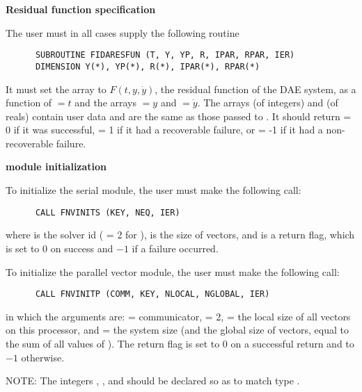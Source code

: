 \begin{Steps}
  
\item {\bf Residual function specification}
  
  The user must in all cases supply the following {\F} routine
\begin{verbatim}
      SUBROUTINE FIDARESFUN (T, Y, YP, R, IPAR, RPAR, IER)
      DIMENSION Y(*), YP(*), R(*), IPAR(*), RPAR(*)
\end{verbatim}
  It must set the  array to $F(t,y,\dot{y})$, the residual function of the DAE
  system, as a function of  $ = t$ and the arrays  $ = y$ and
   $ = \dot{y}$.  
  The arrays  (of integers) and  (of reals) contain user data
  and are the same as those passed to .
  It should return  = 0 if it was successful,
   = 1 if it had a recoverable failure, or
   = -1 if it had a non-recoverable failure.
  
\item  {\bf {\nvector} module initialization}

  {\s} To initialize the serial {\nvector} module, the user must make the
  following call:
\begin{verbatim}
      CALL FNVINITS (KEY, NEQ, IER)
\end{verbatim}
  where 
   is the solver id ( = 2 for {\ida}),
   is the size of vectors, and
   is a return flag, which is set to $0$ on success and $-1$ 
  if a failure occurred.
  
  {\p} To initialize the parallel vector module, the user must make the
  following call:
\begin{verbatim}
      CALL FNVINITP (COMM, KEY, NLOCAL, NGLOBAL, IER)
\end{verbatim}
  in which the arguments are:  = {\mpi} communicator,  = 2,
   = the local size of all vectors on this processor, and
   = the system size (and the global size of vectors, equal to the
  sum of all values of ). The return flag  is
  set to $0$ on a successful return and to $-1$ otherwise.

  NOTE: The integers , , and  should be
  declared so as to match {\C} type .


\end{Steps}
